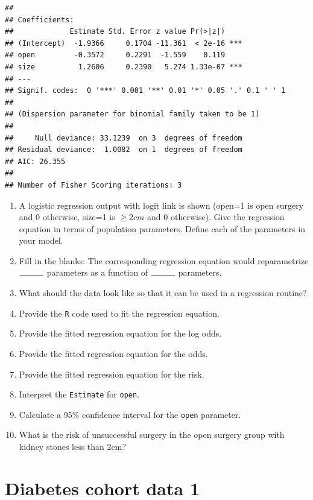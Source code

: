 \documentclass[landscape,twocolumn,letterpaper,9pt,reqno]{article}\usepackage[]{graphicx}\usepackage[]{color}
\newenvironment{knitrout}{}{} %
\newcommand{\compresslist}{ %
	\setlength{\itemsep}{1pt}
	\setlength{\parskip}{0pt}
	\setlength{\parsep}{0pt}
}
\begin{document}
\begin{knitrout}
\color{fgcolor}
\begin{verbatim}
## 
## Coefficients:
##             Estimate Std. Error z value Pr(>|z|)    
## (Intercept)  -1.9366     0.1704 -11.361  < 2e-16 ***
## open         -0.3572     0.2291  -1.559    0.119    
## size          1.2606     0.2390   5.274 1.33e-07 ***
## ---
## Signif. codes:  0 '***' 0.001 '**' 0.01 '*' 0.05 '.' 0.1 ' ' 1
## 
## (Dispersion parameter for binomial family taken to be 1)
## 
##     Null deviance: 33.1239  on 3  degrees of freedom
## Residual deviance:  1.0082  on 1  degrees of freedom
## AIC: 26.355
## 
## Number of Fisher Scoring iterations: 3
\end{verbatim}

\end{knitrout}


\begin{enumerate}\compresslist
	\item A logistic regression output with logit link is shown (open=1 is open surgery and 0 otherwise, size=1 is $\geq 2cm$ and 0 otherwise). Give the regression equation in terms of population parameters. Define each of the parameters in your model.
	\item Fill in the blanks: The corresponding regression equation would reparametrize $\rule{1cm}{0.15mm}$ parameters as a function of $\rule{1cm}{0.15mm}$ parameters.
	\item What should the data look like so that it can be used in a regression routine? 
	\item Provide the \texttt{R} code used to fit the regression equation.
	\item Provide the fitted regression equation for the log odds. 
	\item Provide the fitted regression equation for the odds. 
	\item Provide the fitted regression equation for the risk. 
	\item Interpret the \texttt{Estimate} for \texttt{open}. 
	\item Calculate a 95\% confidence interval for the \texttt{open} parameter. 
	\item What is the risk of unsuccessful surgery in the open surgery group with kidney stones less than 2cm?
\end{enumerate}


\clearpage

\section{Diabetes cohort data 1}
\end{document}
